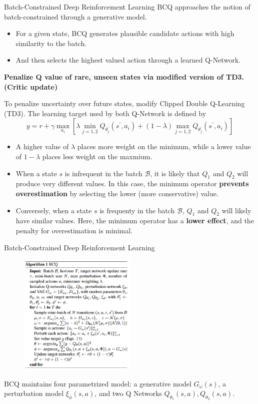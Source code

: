 \documentclass[11pt]{beamer}
\newcommand{\mc}[1]{\mathcal{#1}}
\newcommand{\tb}[1]{\textbf{#1}}
\begin{document}
\begin{frame}{Batch-Constrained Deep Reinforcement Learning}
    BCQ approaches the notion of batch-constrained through a generative model.
    \begin{itemize}
        \item For a given state, BCQ generates plausible candidate actions with high similarity to the batch.
        \item And then selects the highest valued action through a learned Q-Network.
    \end{itemize}

    \tb{Penalize Q value of rare, unseen states via modified version of TD3. (Critic update)}
    \bigskip

    \vfill

    To penalize uncertainty over future states, modify Clipped Double Q-Learning (TD3).
    The learning target used by both Q-Network is defined by
    \[
        y = r + \gamma \max_{a_i} \left[ \lambda \min_{j=1,2} Q_{\theta^\prime_j} (s^\prime,a_i) + (1-\lambda) \max_{j=1,2} Q_{\theta^\prime_j} (s^\prime, a_i)\right]
    \]
    \begin{itemize}
        \item A higher value of $\lambda$ places more weight on the minimum, while a lower value of $1 - \lambda$ places less weight on the maxmium.
        \item When a state $s$ is infrequent in the batch $\mc{B}$, it is likely that $Q_1$ and $Q_2$ will produce very different values.
        In this case, the minimum operator \tb{prevents overestimation} by selecting the lower (more conservative) value.
        \item Conversely, when a state $s$ is frequenty in the batch $\mc{B}$, $Q_1$ and $Q_2$ will likely have similar values.
        Here, the minimum operator has a \tb{lower effect}, and the penalty for overestimation is minimal.
    \end{itemize}
\end{frame}

\begin{frame}{Batch-Constrained Deep Reinforcement Learning}
    \begin{figure}
        \centering
        \includegraphics[width=0.5\textwidth]{algorithm.png}
    \end{figure}
    BCQ maintains four parametrized model: a generative model $G_\omega(s)$, a perturbation model $\xi_\phi (s,a)$, and two Q Networks $Q_{\theta_1}(s,a), Q_{\theta_2}(s,a)$.
\end{frame}
\end{document}
